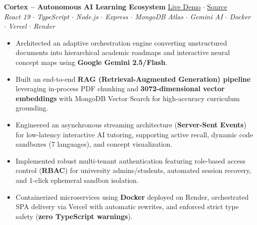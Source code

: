 \documentclass[a4paper,9.5pt]{article}
\begin{document}
\textbf{Cortex -- Autonomous AI Learning Ecosystem} \hfill
\href{https://vidyalaya-eight.vercel.app}{Live Demo} $\cdot$
\href{https://github.com/Lokeshgandreddy81/Vidhyalaya}{Source}\\
\textit{React 19 $\cdot$ TypeScript $\cdot$ Node.js $\cdot$ Express $\cdot$ MongoDB Atlas $\cdot$ Gemini AI $\cdot$ Docker $\cdot$ Vercel $\cdot$ Render}
\begin{itemize}
    \item Architected an adaptive orchestration engine converting unstructured documents into hierarchical academic roadmaps and interactive neural concept maps using \textbf{Google Gemini 2.5/Flash}.
    \item Built an end-to-end \textbf{RAG (Retrieval-Augmented Generation) pipeline} leveraging in-process PDF chunking and \textbf{3072-dimensional vector embeddings} with MongoDB Vector Search for high-accuracy curriculum grounding.
    \item Engineered an asynchronous streaming architecture (\textbf{Server-Sent Events}) for low-latency interactive AI tutoring, supporting active recall, dynamic code sandboxes (7 languages), and concept visualization.
    \item Implemented robust multi-tenant authentication featuring role-based access control (\textbf{RBAC}) for university admins/students, automated session recovery, and 1-click ephemeral sandbox isolation.
    \item Containerized microservices using \textbf{Docker} deployed on Render, orchestrated SPA delivery via Vercel with automatic rewrites, and enforced strict type safety (\textbf{zero TypeScript warnings}).
\end{itemize}
\end{document}
